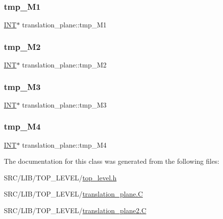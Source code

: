 \subsubsection{\texorpdfstring{tmp\+\_\+\+M1}{tmp\_M1}}
{\footnotesize\ttfamily \mbox{\hyperlink{galois_8h_a09fddde158a3a20bd2dcadb609de11dc}{I\+NT}}$\ast$ translation\+\_\+plane\+::tmp\+\_\+\+M1}

\mbox{\label{classtranslation__plane_a3bfcfe1844a14dab1a5e15b2f6d3a3cc}} 
\subsubsection{\texorpdfstring{tmp\+\_\+\+M2}{tmp\_M2}}
{\footnotesize\ttfamily \mbox{\hyperlink{galois_8h_a09fddde158a3a20bd2dcadb609de11dc}{I\+NT}}$\ast$ translation\+\_\+plane\+::tmp\+\_\+\+M2}

\mbox{\label{classtranslation__plane_aeb877db462ac5423572ac970cdd35c2a}} 
\subsubsection{\texorpdfstring{tmp\+\_\+\+M3}{tmp\_M3}}
{\footnotesize\ttfamily \mbox{\hyperlink{galois_8h_a09fddde158a3a20bd2dcadb609de11dc}{I\+NT}}$\ast$ translation\+\_\+plane\+::tmp\+\_\+\+M3}

\mbox{\label{classtranslation__plane_a5bdd6de0384e9940ec88d71522194b42}} 
\subsubsection{\texorpdfstring{tmp\+\_\+\+M4}{tmp\_M4}}
{\footnotesize\ttfamily \mbox{\hyperlink{galois_8h_a09fddde158a3a20bd2dcadb609de11dc}{I\+NT}}$\ast$ translation\+\_\+plane\+::tmp\+\_\+\+M4}



The documentation for this class was generated from the following files\+:\begin{DoxyCompactItemize}
\item 
S\+R\+C/\+L\+I\+B/\+T\+O\+P\+\_\+\+L\+E\+V\+E\+L/\mbox{\hyperlink{top__level_8h}{top\+\_\+level.\+h}}\item 
S\+R\+C/\+L\+I\+B/\+T\+O\+P\+\_\+\+L\+E\+V\+E\+L/\mbox{\hyperlink{translation__plane_8_c}{translation\+\_\+plane.\+C}}\item 
S\+R\+C/\+L\+I\+B/\+T\+O\+P\+\_\+\+L\+E\+V\+E\+L/\mbox{\hyperlink{translation__plane2_8_c}{translation\+\_\+plane2.\+C}}\end{DoxyCompactItemize}
